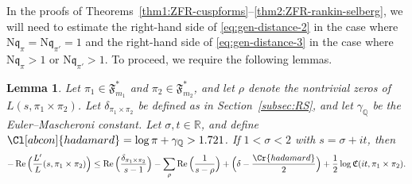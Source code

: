 \documentclass[12pt,reqno]{amsart}
\newtheorem{lem}[thm]{Lemma}
\theoremstyle{remark}
\DeclareMathOperator{\Real}{Re}
\newcommand{\N}{\mathrm{N}}
\newcommand{\kq}{\mathfrak{q}}
\numberwithin{equation}{section}
\begin{document}
	In the proofs of Theorems~\ref{thm1:ZFR-cuspforms}--\ref{thm2:ZFR-rankin-selberg}, we will need to estimate the right-hand side of \eqref{eq:gen-distance-2} in the case where $\N\kq_{\pi} = \N\kq_{\pi'} =1$ and the right-hand side of \eqref{eq:gen-distance-3} in the case where $\N\kq_{\pi}>1$ or $\N\kq_{\pi'}>1$. To proceed, we require the following lemmas.
    \begin{lem}
    \label{lem:stirling}
        Let $\pi_1 \in \mathfrak{F}_{m_1}^*$ and $\pi_2 \in \mathfrak{F}_{m_2}^*$, and   let $\rho$ denote the nontrivial zeros of $L(s,\pi_1 \times \pi_2)$. Let $\delta_{\pi_1\times \pi_2}$ be defined as in Section~\ref{subsec:RS}, and let $\gamma_{\mathbb{Q}}$ be the Euler--Mascheroni constant. 
        Let $\sigma, t \in \mathbb{R}$, and define $\Cl[abcon]{hadamard} = \log{\pi}+\gamma_{\mathbb{Q}} > 1.721$.  If $1<\sigma<2$ with  $s=\sigma+it$, then
        \begin{equation*}
            -\Real\Big(\frac{L'}{L}(s, \pi_1 \times \pi_2)\Big) \le  \Real\Big(\frac{\delta_{\pi_1\times\pi_2}}{s-1}\Big) - \sum_{\rho}\Real\Big( \frac{1}{s-\rho}\Big)
            +\Big(\delta -\frac{\Cr{hadamard}}{2}\Big) + \frac{1}{2}\log\mathfrak{C}(it, \pi_1 \times \pi_2).
        \end{equation*}
    \end{lem}
\end{document}
